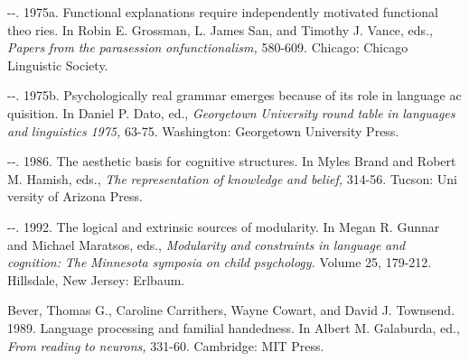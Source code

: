 \begin{listWWNumxiileveli}
\item 
\begin{styleStandard}
{}-{}-. 1975a. Functional explanations require independently motivated functional theo\- ries. In Robin E. Grossman, L. James San, and Timothy J. Vance, eds., \textit{Papers}\textit{ }\textit{from}\textit{ }\textit{the}\textit{ }\textit{parasession}\textit{ }\textit{onfunctionalism,}\textit{ }580-609. Chicago: Chicago Linguistic Society.
\end{styleStandard}


\item 
\begin{styleStandard}
{}-{}-. 1975b. Psychologically real grammar emerges because of its role in language ac\- quisition. In Daniel P. Dato, ed., \textit{Georgetown}\textit{ }\textit{University}\textit{ }\textit{round}\textit{ }\textit{table}\textit{ }\textit{in}\textit{ }\textit{languages}\textit{ }\textit{and}\textit{ }\textit{linguistics}\textit{ }\textit{1975,}\textit{ }63-75. Washington: Georgetown University Press.
\end{styleStandard}


\item 
\begin{styleStandard}
{}-{}-. 1986. The aesthetic basis for cognitive structures. In Myles Brand and Robert M. Hamish, eds., \textit{The}\textit{ }\textit{representation}\textit{ }\textit{of}\textit{ }\textit{knowledge}\textit{ }\textit{and}\textit{ }\textit{belief, }314-56. Tucson: Uni\- versity of Arizona Press.
\end{styleStandard}


\item 
\begin{styleStandard}
{}-{}-. 1992. The logical and extrinsic sources of modularity. In Megan R. Gunnar and Michael Maratsos, eds., \textit{Modularity}\textit{ }\textit{and}\textit{ }\textit{constraints}\textit{ }\textit{in}\textit{ }\textit{language}\textit{ }\textit{and cognition:}\textit{ }\textit{The}\textit{ }\textit{Minnesota}\textit{ }\textit{symposia}\textit{ }\textit{on}\textit{ }\textit{child}\textit{ }\textit{psychology.}\textit{ }Volume 25, 179-212. Hillsdale, New Jersey: Erlbaum.
\end{styleStandard}


\end{listWWNumxiileveli}
\begin{styleStandard}
Bever, Thomas G., Caroline Carrithers, Wayne Cowart, and David J. Townsend. 1989. Language processing and familial handedness. In Albert M. Galaburda, ed., \textit{From}\textit{ }\textit{reading}\textit{ }\textit{to}\textit{ }\textit{neurons,}\textit{ }331-60. Cambridge: MIT Press.
\end{styleStandard}



